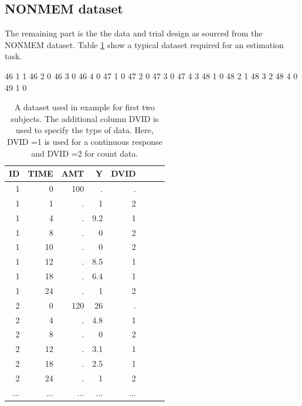 \subsection{NONMEM dataset}
\label{sec:eg7-NONMEMdataset}
The remaining part is the the data and trial design as sourced from the 
NONMEM dataset. Table \ref{tab:example7_dataSet} show a typical dataset required for 
an estimation task.
\begin{table}[htdp]
\begin{center}
\small
46	1	1
46	2	0
46	3	0
46	4	0
47	1	0
47	2	0
47	3	0
47	4	3
48	1	0
48	2	1
48	3	2
48	4	0
49	1	0
\begin{tabular}{rrrrrrrr}\toprule
ID 	& TIME	& AMT	& Y		& DVID \\ \midrule
1 	& 0 		& 100 	& . 		& . \\ 
1 	& 1 		& . 		& 1	 	& 2 \\ 
1 	& 4 		& . 		& 9.2 	& 1 \\ 
1 	& 8 		& . 		& 0 		& 2 \\ 
1 	& 10		& . 		& 0	 	& 2 \\ 
1 	& 12 	& . 		& 8.5 	& 1 \\ 
1 	& 18 	& . 		& 6.4 	& 1 \\ 
1 	& 24 	& . 		& 1 		& 2 \\ 
2 	& 0 		& 120	&  26 	& . \\ 
2 	& 4 		& . 		& 4.8 	& 1 \\ 
2 	& 8 		& . 		& 0 		& 2 \\ 
2 	& 12 	& . 		& 3.1 	& 1 \\ 
2 	& 18 	& . 		& 2.5 	& 1 \\ 
2 	& 24 	& . 		& 1 		& 2 \\ 
...	& ...		& ...		& ...		& ...	\\ \bottomrule
\end{tabular}
\end{center}
\caption{A dataset used in example for first two subjects.
The additional column DVID is used to specify the type of data. Here, 
DVID =1 is used for a continuous response and DVID =2 for count data.}
\label{tab:example7_dataSet}
\end{table}%

